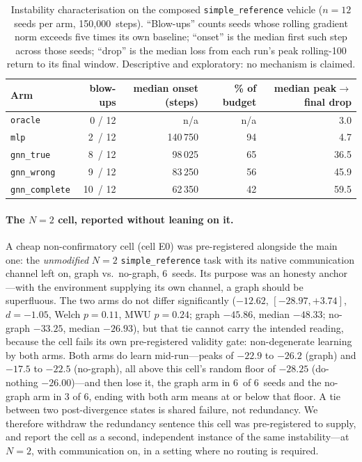 \documentclass[10pt]{article}
\newcommand{\PDseeds}{12}
\newcommand{\PDsteps}{150{,}000}
\newcommand{\PDblowTrue}{8}            %
\newcommand{\PDblowWrong}{9}
\newcommand{\PDblowComplete}{10}
\newcommand{\PDblowMlp}{2}
\newcommand{\PDonsetLo}{42}            %
\newcommand{\PDonsetHi}{65}            %
\newcommand{\PDdropTrue}{36.5}         %
\newcommand{\PDdropWrong}{45.9}
\newcommand{\PDdropComplete}{59.5}
\newcommand{\PDdropMlp}{4.7}
\newcommand{\PDzeroSeeds}{6}
\newcommand{\PDzeroMlp}{-33.25}
\newcommand{\PDzeroMlpMed}{-26.93}
\newcommand{\PDzeroGnn}{-45.86}
\newcommand{\PDzeroGnnMed}{-48.33}
\newcommand{\PDzeroGap}{-12.62}
\newcommand{\PDzeroGapCI}{[-28.97, +3.74]}
\newcommand{\PDzeroD}{{-}1.05}
\newcommand{\PDzeroFloor}{-28.25}
\newcommand{\PDzeroNoop}{-26.00}
\begin{document}
\begin{table}[!ht]
  \centering
  \footnotesize
  \caption{Instability characterisation on the composed
  \texttt{simple\_reference} vehicle ($n{=}\PDseeds$ seeds per arm,
  \PDsteps\ steps). ``Blow-ups'' counts seeds whose rolling gradient norm exceeds five
  times its own baseline; ``onset'' is the median first such step across those
  seeds; ``drop'' is the median loss from each run's peak rolling-100 return to
  its final window. Descriptive and exploratory: no mechanism is claimed.}
  \label{tab:transfer-instability}
  \begin{tabular}{lrrrr}
    \toprule
    Arm & blow-ups & median onset (steps) & \% of budget & median peak$\to$final drop \\
    \midrule
    \texttt{oracle}        & 0 / \PDseeds  & n/a & n/a & 3.0 \\
    \texttt{mlp}           & \PDblowMlp\ / \PDseeds & 140\,750 & 94 & \PDdropMlp \\
    \texttt{gnn\_true}     & \PDblowTrue\ / \PDseeds & \phantom{0}98\,025 & \PDonsetHi & \PDdropTrue \\
    \texttt{gnn\_wrong}    & \PDblowWrong\ / \PDseeds & \phantom{0}83\,250 & 56 & \PDdropWrong \\
    \texttt{gnn\_complete} & \PDblowComplete\ / \PDseeds & \phantom{0}62\,350 & \PDonsetLo & \PDdropComplete \\
    \bottomrule
  \end{tabular}
\end{table}

\paragraph{The \texorpdfstring{$N{=}2$}{N=2} cell, reported without leaning on it.} A cheap
non-confirmatory cell (cell E0) was pre-registered alongside the main one: the
\emph{unmodified} $N{=}2$ \texttt{simple\_reference} task with its native
communication channel left on, graph vs.\ no-graph, \PDzeroSeeds\ seeds. Its
purpose was an honesty anchor---with the environment supplying its own channel,
a graph should be superfluous. The two arms do not differ significantly
($\PDzeroGap$, $\PDzeroGapCI$, $d{=}\PDzeroD$, Welch $p{=}0.11$, MWU
$p{=}0.24$; graph $\PDzeroGnn$, median $\PDzeroGnnMed$; no-graph $\PDzeroMlp$,
median $\PDzeroMlpMed$), but that tie cannot carry the intended reading,
because the cell fails its own pre-registered validity gate: non-degenerate
learning by both arms. Both arms do learn mid-run---peaks of $-22.9$ to $-26.2$
(graph) and $-17.5$ to $-22.5$ (no-graph), all above this cell's random floor
of $\PDzeroFloor$ (do-nothing $\PDzeroNoop$)---and then lose it, the graph arm
in \PDzeroSeeds\ of \PDzeroSeeds\ seeds and the no-graph arm in 3 of
\PDzeroSeeds, ending with both arm means at or below that floor. A tie between
two post-divergence states is shared failure, not redundancy. We therefore
withdraw the redundancy sentence this cell was pre-registered to supply, and
report the cell as a second, independent instance of the same instability---at
$N{=}2$, with communication on, in a setting where no routing is required.
\end{document}
